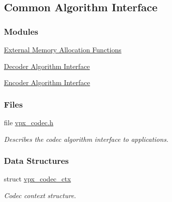 \hypertarget{group__codec}{\subsection{Common Algorithm Interface}
\label{group__codec}
}
\subsubsection*{Modules}
\begin{DoxyCompactItemize}
\item 
\hyperlink{group__cap__xma}{External Memory Allocation Functions}
\item 
\hyperlink{group__decoder}{Decoder Algorithm Interface}
\item 
\hyperlink{group__encoder}{Encoder Algorithm Interface}
\end{DoxyCompactItemize}
\subsubsection*{Files}
\begin{DoxyCompactItemize}
\item 
file \hyperlink{vpx__codec_8h}{vpx\-\_\-codec.\-h}
\begin{DoxyCompactList}\small\item\em Describes the codec algorithm interface to applications. \end{DoxyCompactList}\end{DoxyCompactItemize}
\subsubsection*{Data Structures}
\begin{DoxyCompactItemize}
\item 
struct \hyperlink{structvpx__codec__ctx}{vpx\-\_\-codec\-\_\-ctx}
\begin{DoxyCompactList}\small\item\em Codec context structure. \end{DoxyCompactList}\end{DoxyCompactItemize}
